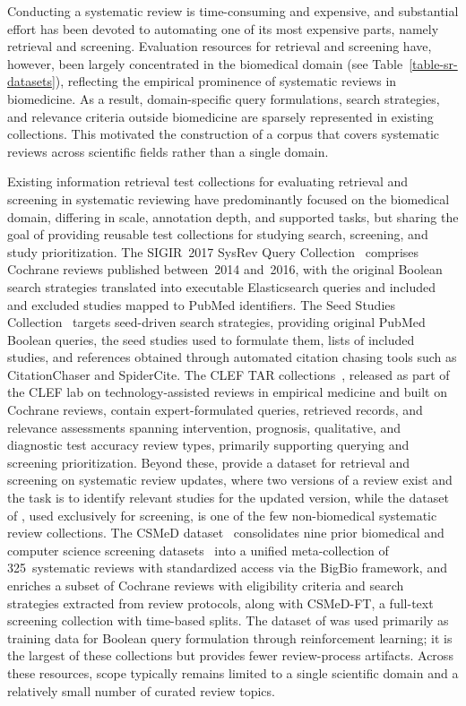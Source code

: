 Conducting a systematic review is time-consuming and expensive, and substantial effort has been devoted to automating one of its most expensive parts, namely retrieval and screening. Evaluation resources for retrieval and screening have, however, been largely concentrated in the biomedical domain (see Table~\ref{table-sr-datasets}), reflecting the empirical prominence of systematic reviews in biomedicine. As a result, domain-specific query formulations, search strategies, and relevance criteria outside biomedicine are sparsely represented in existing collections. This motivated the construction of a corpus that covers systematic reviews across scientific fields rather than a single domain.

Existing information retrieval test collections for evaluating retrieval and screening in systematic reviewing have predominantly focused on the biomedical domain, differing in scale, annotation depth, and supported tasks, but sharing the goal of providing reusable test collections for studying search, screening, and study prioritization. The SIGIR~2017 SysRev Query Collection~\cite{scells:2017} comprises Cochrane reviews published between~2014 and~2016, with the original Boolean search strategies translated into executable Elasticsearch queries and included and excluded studies mapped to PubMed identifiers. The Seed Studies Collection~\cite{wang:2022} targets seed-driven search strategies, providing original PubMed Boolean queries, the seed studies used to formulate them, lists of included studies, and references obtained through automated citation chasing tools such as CitationChaser and SpiderCite. The CLEF TAR collections~\cite{kanoulas:2017,kanoulas:2018,kanoulas:2019}, released as part of the CLEF lab on technology-assisted reviews in empirical medicine and built on Cochrane reviews, contain expert-formulated queries, retrieved records, and relevance assessments spanning intervention, prognosis, qualitative, and diagnostic test accuracy review types, primarily supporting querying and screening prioritization. Beyond these, \citet{alharbi:2019} provide a dataset for retrieval and screening on systematic review updates, where two versions of a review exist and the task is to identify relevant studies for the updated version, while the dataset of \citet{hannousse:2021}, used exclusively for screening, is one of the few non-biomedical systematic review collections. The CSMeD dataset~\cite{kusa:2023} consolidates nine prior biomedical and computer science screening datasets~\cite{cohen:2006,wallace:2010,howard:2016,scells:2017,kanoulas:2017,kanoulas:2018,kanoulas:2019,alharbi:2019,hannousse:2021} into a unified meta-collection of 325~systematic reviews with standardized access via the BigBio framework, and enriches a subset of Cochrane reviews with eligibility criteria and search strategies extracted from review protocols, along with CSMeD-FT, a full-text screening collection with time-based splits. The dataset of \citet{wang:2025b} was used primarily as training data for Boolean query formulation through reinforcement learning; it is the largest of these collections but provides fewer review-process artifacts. Across these resources, scope typically remains limited to a single scientific domain and a relatively small number of curated review topics.

